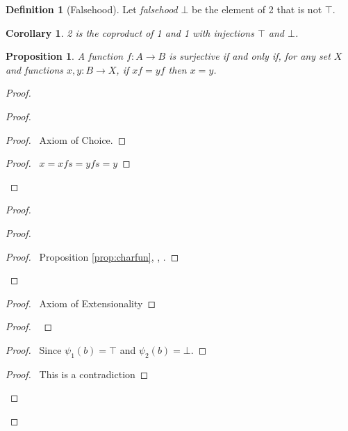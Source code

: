 \documentclass{book}
\let\qed\relax
\newtheorem{prop}[ax]{Proposition}
\newtheorem{cor}{Corollary}[ax]
\theoremstyle{definition}
\newtheorem{df}[ax]{Definition}
\begin{document}
\begin{df}[Falsehood]
Let \emph{falsehood} $\bot$ be the element of 2 that is not $\top$.
\end{df}

\begin{cor}
2 is the coproduct of 1 and 1 with injections $\top$ and $\bot$.
\end{cor}

\begin{prop}
A function $f : A \rightarrow B$ is surjective if and only if, for any set $X$ and functions $x,y : B \rightarrow X$, if $xf = yf$ then $x = y$.
\end{prop}

\begin{proof}
\pf
{}
\begin{proof}
	\begin{proof}
		\pf\ Axiom of Choice.
	\end{proof}
	\begin{proof}
		\pf\ $x = xfs = yfs = y$
	\end{proof}
\end{proof}
\begin{proof}
	\begin{proof}
		\begin{proof}
			\pf\ Proposition \ref{prop:charfun}, , .
		\end{proof}
	\end{proof}
	\begin{proof}
		\pf\ Axiom of Extensionality
	\end{proof}
	\begin{proof}
		\pf\ 
	\end{proof}
	\begin{proof}
		\pf\ Since $\psi_1(b) = \top$ and $\psi_2(b) = \bot$.
	\end{proof}
	\qedstep
	\begin{proof}
		\pf\ This is a contradiction
	\end{proof}
\end{proof}
\qed
\end{proof}
\end{document}
